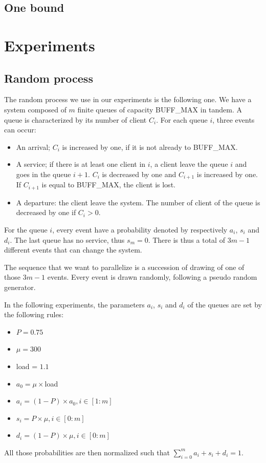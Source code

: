 \documentclass[a4paper,10pt]{article}
\begin{document}
\subsection{One bound}
\label{sec:onebound}

\section{Experiments}

\subsection{Random process}
\label{sec:randomproc}
The random process we use in our experiments is the following one. We have a system composed of $m$ finite queues of capacity BUFF\_MAX in tandem. A queue is characterized by its number of client $C_i$.  For each queue $i$, three events can occur:
\begin{itemize}
\item An arrival; $C_i$ is increased by one, if it is not already to BUFF\_MAX.
\item A service; if there is at least one client in $i$, a client leave the queue $i$ and goes in the queue $i+1$. $C_i$ is decreased by one and $C_{i+1}$ is increased by one. If $C_{i+1}$ is equal to BUFF\_MAX, the client is lost.
\item A departure: the client leave the system. The number of client of the queue is decreased by one if $C_i >0$.
\end{itemize}

For the queue $i$, every event have a probability denoted by respectively $a_i$, $s_i$ and $d_i$. The last queue has no service, thus $s_m = 0 $. There is thus a total of $3m-1$ different events that can change the system.

The sequence that we want to parallelize is a succession of drawing of one of those $3m-1$ events. Every event is drawn randomly, following a pseudo random generator. 

In the following experiments, the parameters $a_i$, $s_i$ and $d_i$ of the queues are set by the following rules:
\begin{itemize}
\item $P = 0.75$
\item $\mu = 300$
\item load = $1.1$
\item $a_0 = \mu \times $load
\item $a_i = (1-P) \times a_0, i \in [1:m]$
\item $s_i = P \times \mu, i \in [0:m]$
\item $d_i = (1-P) \times \mu, i \in [0:m]$
\end{itemize}
All those probabilities are then normalized such that $\sum\limits_{i=0}^m a_i + s_i + d_i = 1$.
\end{document}
